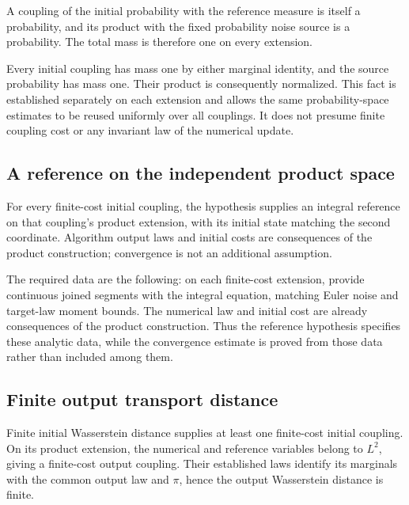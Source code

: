 \documentclass[11pt,a4paper]{report}
\begin{document}
A coupling of the initial probability with the reference measure is itself a probability, and its product with the fixed probability noise source is a probability. The total mass is therefore one on every extension.



Every initial coupling has mass one by either marginal identity, and the source probability has mass one. Their product is consequently normalized. This fact is established separately on each extension and allows the same probability-space estimates to be reused uniformly over all couplings. It does not presume finite coupling cost or any invariant law of the numerical update.

\subsection{\texorpdfstring{A reference on the independent product space}{A reference on the independent product space}}
\label{report-step-UnadjustedLangevin-ProductReference-lean-10}


For every finite-cost initial coupling, the hypothesis supplies an integral reference on that coupling's product extension, with its initial state matching the second coordinate. Algorithm output laws and initial costs are consequences of the product construction; convergence is not an additional assumption.



The required data are the following: on each finite-cost extension, provide continuous joined segments with the integral equation, matching Euler noise and target-law moment bounds. The numerical law and initial cost are already consequences of the product construction. Thus the reference hypothesis specifies these analytic data, while the convergence estimate is proved from those data rather than included among them.

\subsection{\texorpdfstring{Finite output transport distance}{Finite output transport distance}}
\label{report-step-UnadjustedLangevin-ProductReference-lean-11}


Finite initial Wasserstein distance supplies at least one finite-cost initial coupling. On its product extension, the numerical and reference variables belong to \(L^2\), giving a finite-cost output coupling. Their established laws identify its marginals with the common output law and \(\pi\), hence the output Wasserstein distance is finite.
\end{document}
